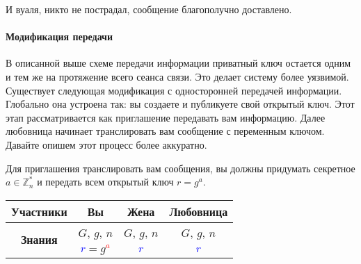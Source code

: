 И вуаля, никто не пострадал, сообщение благополучно доставлено.

\paragraph{Модификация передачи}


В описанной выше схеме передачи информации приватный ключ остается одним и тем же на протяжение всего сеанса связи. Это делает систему более уязвимой. Существует следующая модификация с односторонней передачей информации. Глобально она устроена так: вы создаете и публикуете свой открытый ключ. Этот этап рассматривается как приглашение передавать вам информацию. Далее любовница начинает транслировать вам сообщение с переменным ключом. Давайте опишем этот процесс более аккуратно.

Для приглашения транслировать вам сообщения, вы должны придумать секретное $a\in \mathbb Z_n^*$ и передать всем открытый ключ $r = g^a$.
\begin{center}
\begin{tabular}{|c|c|c|c|}
\hline
{\bf Участники}&{Вы}&{Жена}&{Любовница}\\
\hline
\multirow{2}{*}{\bf Знания}&{\textcolor{OliveGreen}{$G$}, \textcolor{OliveGreen}{$g$}, \textcolor{OliveGreen}{$n$}}&{\textcolor{OliveGreen}{$G$}, \textcolor{OliveGreen}{$g$}, \textcolor{OliveGreen}{$n$}}&{\textcolor{OliveGreen}{$G$}, \textcolor{OliveGreen}{$g$}, \textcolor{OliveGreen}{$n$}}\\
{}&{ \textcolor{blue}{$r$}$=$\textcolor{OliveGreen}{$ g$}\textcolor{red}{${}^a$}}&{\textcolor{blue}{$r$}}&{\textcolor{blue}{$r$}}\\
\hline
\end{tabular}
\end{center}

